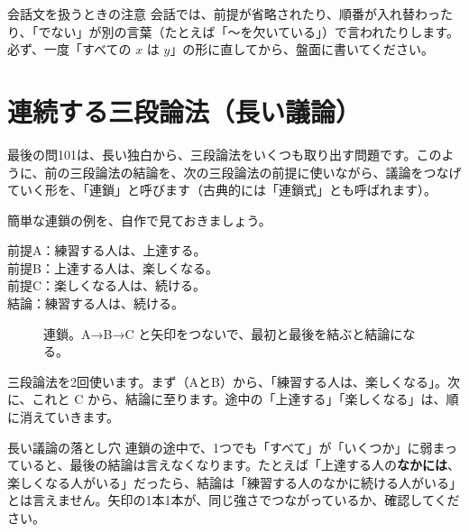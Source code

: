 \documentclass[a4paper,11pt,openany]{ltjsbook}
\begin{document}
\begin{notebox}{会話文を扱うときの注意}
会話では、前提が省略されたり、順番が入れ替わったり、「でない」が別の言葉（たとえば「～を欠いている」）で言われたりします。必ず、一度「すべての $x$ は $y$」の形に直してから、盤面に書いてください。
\end{notebox}

\section{連続する三段論法（長い議論）}

最後の問101は、長い独白から、三段論法をいくつも取り出す問題です。このように、前の三段論法の結論を、次の三段論法の前提に使いながら、議論をつなげていく形を、「連鎖」と呼びます（古典的には「連鎖式」とも呼ばれます）。

簡単な連鎖の例を、自作で見ておきましょう。

\begin{center}
前提A：練習する人は、上達する。\\
前提B：上達する人は、楽しくなる。\\
前提C：楽しくなる人は、続ける。\\
結論：練習する人は、続ける。
\end{center}

\begin{figure}[htbp]
\centering
{}
\caption{連鎖。A→B→C と矢印をつないで、最初と最後を結ぶと結論になる。}
\end{figure}

三段論法を2回使います。まず（AとB）から、「練習する人は、楽しくなる」。次に、これと C から、結論に至ります。途中の「上達する」「楽しくなる」は、順に消えていきます。

\begin{notebox}{長い議論の落とし穴}
連鎖の途中で、1つでも「すべて」が「いくつか」に弱まっていると、最後の結論は言えなくなります。たとえば「上達する人の\textbf{なかには}、楽しくなる人がいる」だったら、結論は「練習する人のなかに続ける人がいる」とは言えません。矢印の1本1本が、同じ強さでつながっているか、確認してください。
\end{notebox}
\end{document}
